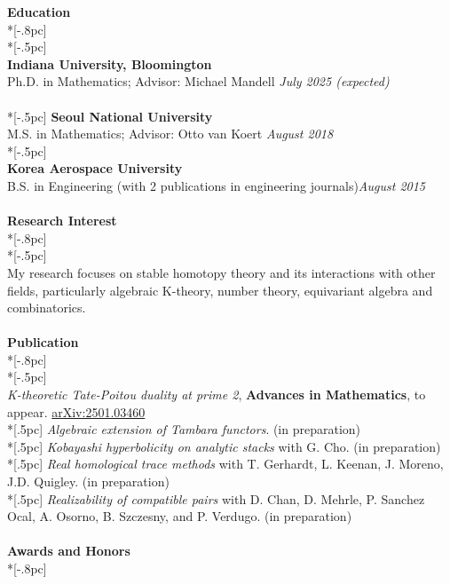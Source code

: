 \documentclass{article}
\begin{document}
{\Large \bf Education} \\*[-.8pc]
\underline{\hspace{6.5in}} \\*[-.5pc]
\\
{\bf Indiana University, Bloomington}\\ 
{Ph.D. in Mathematics; Advisor: Michael Mandell} \hfill {\it  July 2025  (expected)} \\
\\*[-.5pc]
{\bf Seoul National University} \\ 
{M.S. in Mathematics; Advisor: Otto van Koert} \hfill{\it August 2018 } \\*[-.5pc]
\\
{\bf Korea Aerospace University} \\
{B.S. in Engineering (with 2 publications in engineering journals)}\hfill{\it August 2015}\\
\\
{\Large \bf Research Interest} \\*[-.8pc]
\underline{\hspace{6.5in}} \\*[-.5pc]
\\
My research focuses on stable homotopy theory and its interactions with other fields, particularly algebraic K-theory, number theory, equivariant algebra and combinatorics.
\\
\\
{\Large \bf Publication} \\*[-.8pc]
\underline{\hspace{6.5in}} \\*[-.5pc]
\\
{\it K-theoretic Tate-Poitou duality at prime 2}, {\bf Advances in Mathematics}, to appear. \href{https://arxiv.org/abs/2501.03460}{arXiv:2501.03460}\\*[.5pc]
{\it Algebraic extension of Tambara functors}. (in preparation)\\*[.5pc]
{\it Kobayashi hyperbolicity on analytic stacks} with G. Cho. (in preparation)\\*[.5pc]
{\it Real homological trace methods} with T. Gerhardt, L. Keenan, J. Moreno, J.D. Quigley. (in preparation)\\*[.5pc]
{\it Realizability of compatible pairs} with D. Chan, D. Mehrle, P. Sanchez Ocal, A. Osorno, B. Szczesny, and P. Verdugo. (in preparation)\\
\\ 
{\Large \bf Awards and Honors} \\*[-.8pc]
\end{document}
